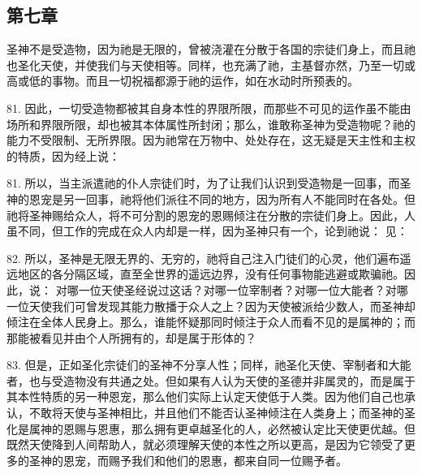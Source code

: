 
\subsection{第七章}

圣神不是受造物，因为祂是无限的，曾被浇灌在分散于各国的宗徒们身上，而且祂也圣化天使，并使我们与天使相等。同样，也充满了祂，主基督亦然，乃至一切或高或低的事物。而且一切祝福都源于祂的运作，如在水动时所预表的。\par

81. 因此，一切受造物都被其自身本性的界限所限，而那些不可见的运作虽不能由场所和界限所限，却也被其本体属性所封闭；那么，谁敢称圣神为受造物呢？祂的能力不受限制、无所界限。因为祂常在万物中、处处存在，这无疑是天主性和主权的特质，因为经上说：\par

81. 所以，当主派遣祂的仆人宗徒们时，为了让我们认识到受造物是一回事，而圣神的恩宠是另一回事，祂将他们派往不同的地方，因为所有人不能同时在各处。但祂将圣神赐给众人，将不可分割的恩宠的恩赐倾注在分散的宗徒们身上。因此，人虽不同，但工作的完成在众人内却是一样，因为圣神只有一个，论到祂说： 见：\par

82. 所以，圣神是无限无界的、无穷的，祂将自己注入门徒们的心灵，他们遍布遥远地区的各分隔区域，直至全世界的遥远边界，没有任何事物能逃避或欺骗祂。因此，说： 对哪一位天使圣经说过这话？对哪一位宰制者？对哪一位大能者？对哪一位天使我们可曾发现其能力散播于众人之上？因为天使被派给少数人，而圣神却倾注在全体人民身上。那么，谁能怀疑那同时倾注于众人而看不见的是属神的；而那能被看见并由个人所拥有的，却是属于形体的？\par

83. 但是，正如圣化宗徒们的圣神不分享人性；同样，祂圣化天使、宰制者和大能者，也与受造物没有共通之处。但如果有人认为天使的圣德并非属灵的，而是属于其本性特质的另一种恩宠，那么他们实际上认定天使低于人类。因为他们自己也承认，不敢将天使与圣神相比，并且他们不能否认圣神倾注在人类身上；而圣神的圣化是属神的恩赐与恩惠，那么拥有更卓越圣化的人，必然被认定比天使更优越。但既然天使降到人间帮助人，就必须理解天使的本性之所以更高，是因为它领受了更多的圣神的恩宠，而赐予我们和他们的恩惠，都来自同一位赐予者。\par

